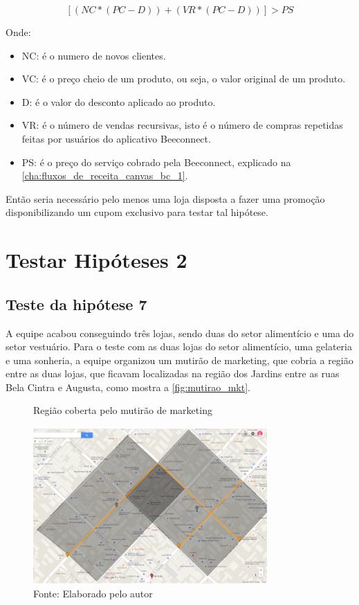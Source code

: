 \[[(NC * (PC - D)) + (VR * (PC - D))] > PS\]

Onde: 
\begin{itemize}
\item NC: é o numero de novos clientes.
\item VC: é o preço cheio de um produto, ou seja, o valor original de um produto.
\item D: é o valor do desconto aplicado ao produto.
\item VR: é o número de vendas recursivas, isto é o número de compras repetidas feitas por usuários do aplicativo Beeconnect.
\item PS: é o preço do serviço cobrado pela Beeconnect, explicado na \autoref{cha:fluxos_de_receita_canvas_bc_1}.
\end{itemize}

Então seria necessário pelo menos uma loja disposta a fazer uma promoção disponibilizando um cupom exclusivo para testar tal hipótese.
\section{Testar Hipóteses 2}
\label{cha:testar_hipoteses_2}

\subsection{Teste da hipótese 7}
\label{cha:teste_hipotese_7}
A equipe acabou conseguindo três lojas, sendo duas do setor alimentício e uma do setor vestuário. Para o teste com as duas lojas do setor alimentício, uma gelateria e uma sonheria, a equipe organizou um mutirão de marketing, que cobria a região entre as duas lojas, que ficavam localizadas na região dos Jardins entre as ruas Bela Cintra e Augusta, como mostra a \autoref{fig:mutirao_mkt}.
\begin{figure}[H]
\caption{Região coberta pelo mutirão de marketing}
\centerline{\includegraphics[width=0.8\textwidth]{img/mutirao_mkt}}
\label{fig:mutirao_mkt}
\caption* {Fonte: Elaborado pelo autor}
\end{figure}

